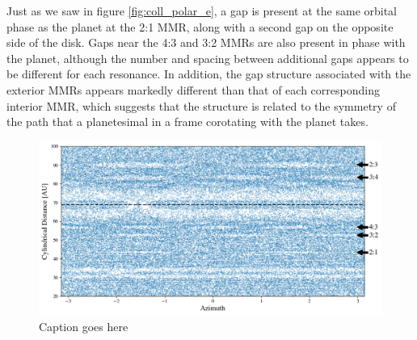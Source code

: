 \documentclass[twocolumn]{aastex63}
\begin{document}
Just as we saw in figure \ref{fig:coll_polar_e}, a gap is present at the same orbital phase as the planet at the 2:1 MMR, along with a second gap on
the opposite side of the disk. Gaps near the 4:3 and 3:2 MMRs are also present in phase with the planet, although the number and spacing between 
additional gaps appears to be different for each resonance. In addition, the gap structure associated with the exterior MMRs appears markedly
different than that of each corresponding interior MMR, which suggests that the structure is related to the symmetry of the path that a planetesimal
in a frame corotating with the planet takes.

\begin{figure}
    \includegraphics[width=\textwidth]{figures/boley_rtheta}
    \caption{Caption goes here\label{fig:boley_rtheta}}
\end{figure}
\end{document}
